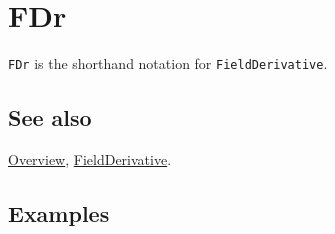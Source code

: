 \documentclass[../FeynCalcManual.tex]{subfiles}
\begin{document}
\hypertarget{fdr}{%
\section{FDr}\label{fdr}}

\texttt{FDr} is the shorthand notation for \texttt{FieldDerivative}.

\subsection{See also}

\hyperlink{toc}{Overview}, \hyperlink{fieldderivative}{FieldDerivative}.

\subsection{Examples}
\end{document}
